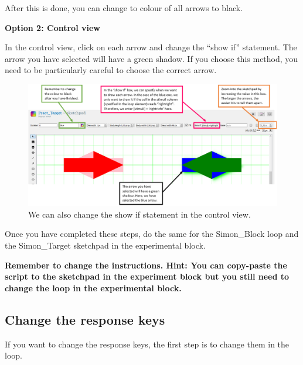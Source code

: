 \documentclass[
]{book}
\begin{document}
After this is done, you can change to colour of all arrows to black.

\textbf{Option 2: Control view}

In the control view, click on each arrow and change the ``show if'' statement. The arrow you have selected will have a green shadow. If you choose this method, you need to be particularly careful to choose the correct arrow.

\begin{figure}

{\centering \includegraphics[width=0.99\linewidth]{images/changesimon/08option2} 

}

\caption{We can also change the show if statement in the control view.}\label{fig:Figure2-14}
\end{figure}

Once you have completed these steps, do the same for the Simon\_Block loop and the Simon\_Target sketchpad in the experimental block.

\textbf{Remember to change the instructions. Hint: You can copy-paste the script to the sketchpad in the experiment block but you still need to change the loop in the experimental block.}

\hypertarget{change-the-response-keys}{%
\subsection{Change the response keys}\label{change-the-response-keys}}

If you want to change the response keys, the first step is to change them in the loop.
\end{document}
